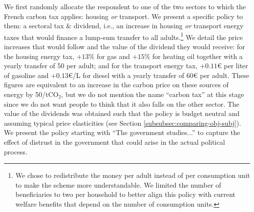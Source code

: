 \documentclass[12pt]{article} %
\begin{document}
We first randomly allocate the respondent to one of the two sectors to which the French carbon tax applies: housing \textit{or} transport. We present a specific policy to them: a sectoral tax \& dividend, i.e., an increase in housing \textit{or} transport energy taxes that would finance a lump-sum transfer to all adults.\footnote{We chose to redistribute the money per adult instead of per consumption unit to make the scheme more understandable. We limited the number of beneficiaries to two per household to better align this policy with current welfare benefits that depend on the number of consumption units.} We detail the price increases that would follow and the value of the dividend they would receive: for the housing energy tax, $+13\%$ for gas and $+15\%$ for heating oil together with a yearly transfer of 50\euros{} per adult; and for the transport energy tax, $+0.11$\euro{} per liter of gasoline and $+0.13$\euro{}/L for diesel with a yearly transfer of 60\euro{} per adult. These figures are equivalent to an increase in the carbon price on these sources of energy by 50\euros{}/t$\text{CO}_{2}$, but we do not mention the name ``carbon tax'' at this stage since we do not want people to think that it also falls on the other sector. The value of the dividends was obtained such that the policy is budget neutral and assuming typical price elasticities (see Section \ref{subsubsec:comparing-obj-subj}). We present the policy starting with ``The government studies...'' to capture the effect of distrust in the government that could arise in the actual political process.
\end{document}
